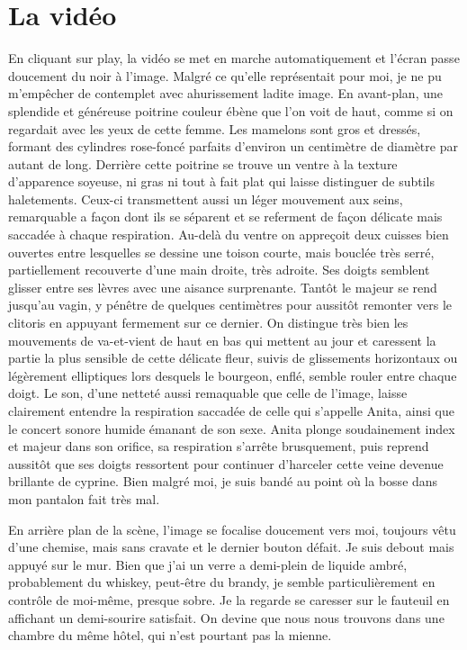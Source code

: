 \chapter{La vidéo}
En cliquant sur play, la vidéo se met en marche automatiquement et l'écran passe doucement du noir à l'image. Malgré ce qu'elle représentait pour moi, je ne pu m'empêcher de contemplet avec ahurissement ladite image. En avant-plan, une splendide et généreuse poitrine couleur ébène que l'on voit de haut, comme si on regardait avec les yeux de cette femme. Les mamelons sont gros et dressés, formant des cylindres rose-foncé parfaits d'environ un centimètre de diamètre par autant de long. Derrière cette poitrine se trouve un ventre à la texture d'apparence soyeuse, ni gras ni tout à fait plat qui laisse distinguer de subtils haletements. Ceux-ci transmettent aussi un léger mouvement aux seins, remarquable a façon dont ils se séparent et se referment de façon délicate mais saccadée à chaque respiration. Au-delà du ventre on appreçoit deux cuisses bien ouvertes entre lesquelles se dessine une toison courte, mais bouclée très serré, partiellement recouverte d'une main droite, très adroite. Ses doigts semblent glisser entre ses lèvres avec une aisance surprenante. Tantôt le majeur se rend jusqu'au vagin, y pénêtre de quelques centimètres pour aussitôt remonter vers le clitoris en appuyant fermement sur ce dernier. On distingue très bien les mouvements de va-et-vient de haut en bas qui mettent au jour et caressent la partie la plus sensible de cette délicate fleur, suivis de glissements horizontaux ou légèrement elliptiques lors desquels le bourgeon, enflé, semble rouler entre chaque doigt.  Le son, d'une netteté aussi remaquable que celle de l'image, laisse clairement entendre la respiration saccadée de celle qui s'appelle Anita, ainsi que le concert sonore humide émanant de son sexe. Anita plonge soudainement index et majeur dans son orifice, sa respiration s'arrête brusquement, puis reprend aussitôt que ses doigts ressortent pour continuer d'harceler cette veine devenue brillante de cyprine. Bien malgré moi, je suis bandé au point où la bosse dans mon pantalon fait très mal.

En arrière plan de la scène, l'image se focalise doucement vers moi, toujours vêtu d'une chemise, mais sans cravate et le dernier bouton défait.  Je suis debout mais appuyé sur le mur. Bien que j'ai un verre a demi-plein de liquide ambré, probablement du whiskey, peut-être du brandy, je semble particulièrement en contrôle de moi-même, presque sobre. Je la regarde se caresser sur le fauteuil en affichant un demi-sourire satisfait. On devine que nous nous trouvons dans une chambre du même hôtel, qui n'est pourtant pas la mienne.

